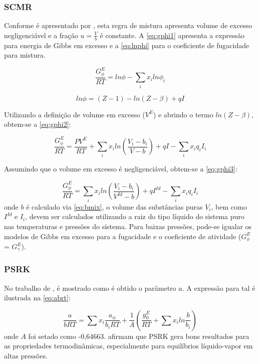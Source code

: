 \subsubsection{SCMR}
Conforme é apresentado por , esta regra de
mistura apresenta volume de excesso negligenciável e a fração $ u =
\frac{V}{b} $ é constante. A \autoref{eq:gphi1} apresenta a expressão para 
energia de Gibbs em excesso e a \autoref{eq:lnphi} para o coeficiente de
fugacidade para mistura.

\begin{equation}\label{eq:gphi1}
\frac{G_\phi^E}{RT} = ln\phi - \sum_ix_iln\phi_i
\end{equation}

\begin{equation}\label{eq:lnphi}
ln\phi = (Z - 1) - ln(Z - \beta) + qI
\end{equation}

Utilizando a definição de volume em excesso ($V^E$) e abrindo o termo $ln(Z -
\beta)$, obtem-se a \autoref{eq:gphi2}:

\begin{equation}\label{eq:gphi2}
\frac{G_\phi^E}{RT} = \frac{PV^E}{RT} + \sum_ix_iln\left ( \frac{V_i - b_i}{V -
b} \right ) + qI - \sum_ix_iq_iI_i
\end{equation}

Assumindo que o volume em excesso é negligenciável, obtem-se a
\autoref{eq:gphi3}:

\begin{equation}\label{eq:gphi3}
\frac{G_\phi^E}{RT} = \sum_ix_iln\left ( \frac{V_i - b_i}{V^{Id} -
b} \right ) + qI^{Id} - \sum_ix_iq_iI_i
\end{equation}
onde $b$ é calculado via \autoref{eq:bmix}, o volume das substâncias puras
$V_i$, bem como $I^{Id}$ e $I_i$, devem ser calculados utilizando a raiz do tipo
líquido do sistema puro nas temperaturas e pressões do sistema. Para baixas pressões, pode-se igualar os
 modelos de Gibbs em excesso para a fugacidade e o coeficiente de atividade
 ($G_\phi^E$ = $G_\gamma^E$).

\subsubsection{PSRK}

No trabalho de , é mostrado como é obtido o parâmetro $a$.
A expressão para tal é ilustrada na \autoref{eq:abrt}:


\begin{equation}\label{eq:abrt}
\frac{a}{bRT} = \sum x_i\frac{a_{ii}}{b_iRT}+\frac{1}{A}\left (
\frac{g_0^E}{RT}+\sum x_iln\frac{b}{b_i} \right )
\end{equation}
onde $A$ foi setado como -0,64663.  afirmam
que PSRK gera bons resultados para as propriedades termodinâmicas, especialmente para 
equilíbrios líquido-vapor em altas pressões.

